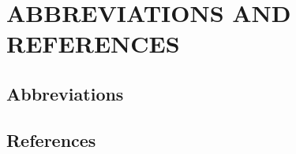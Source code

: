 \chapter{ABBREVIATIONS AND REFERENCES}
\label{sec:abbreviations_references}
\section{Abbreviations}
\printglossary[type=\acronymtype, style=compactacronyms, title={}, toctitle={}]


\section{References}
\nocite{*}
\printbibliography[heading=none]




